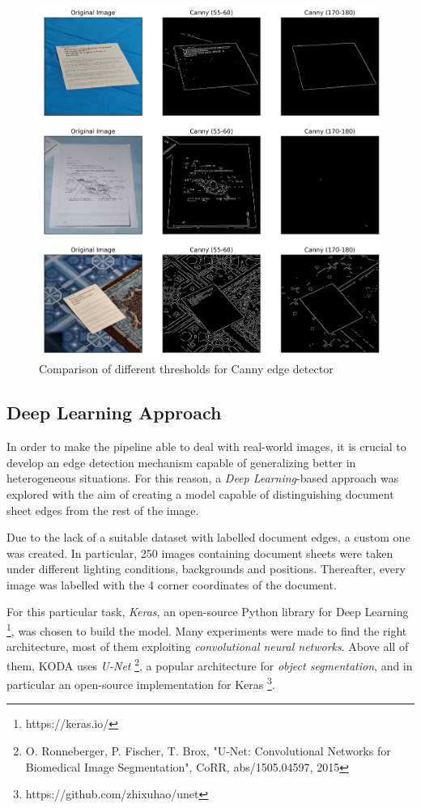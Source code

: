 \documentclass[a4paper]{article}
\begin{document}
\begin{figure}[htb!]
	\includegraphics[width=\linewidth]{canny_comparison.png}
	\caption{Comparison of different thresholds for Canny edge detector}
	\label{fig:canny_comparison}
\end{figure}

\subsection{Deep Learning Approach}

In order to make the pipeline able to deal with real-world images, it is crucial to develop an
edge detection mechanism capable of generalizing better in heterogeneous situations. 
For this reason, a \textit{Deep Learning}-based approach was explored with the aim of creating a model
capable of distinguishing document sheet edges from the rest of the image.

Due to the lack of a suitable dataset with labelled document edges, a custom one was created.
In particular, 250 images containing document sheets were taken under different lighting conditions, 
backgrounds and positions. Thereafter, every image was labelled with the 4 corner coordinates of the document.

For this particular task, \textit{Keras}, an open-source Python library for Deep Learning \footnote{https://keras.io/}, was chosen to build the model. Many experiments were made to find the right architecture, most of them 
exploiting \textit{convolutional neural networks}. Above all of them, KODA uses \textit{U-Net}
\footnote{O. Ronneberger, P. Fischer, T. Brox, "U-Net: Convolutional Networks for Biomedical Image Segmentation", CoRR, abs/1505.04597, 2015}, a popular architecture for \textit{object segmentation}, and in particular an open-source implementation for Keras \footnote{https://github.com/zhixuhao/unet}.
\end{document}
